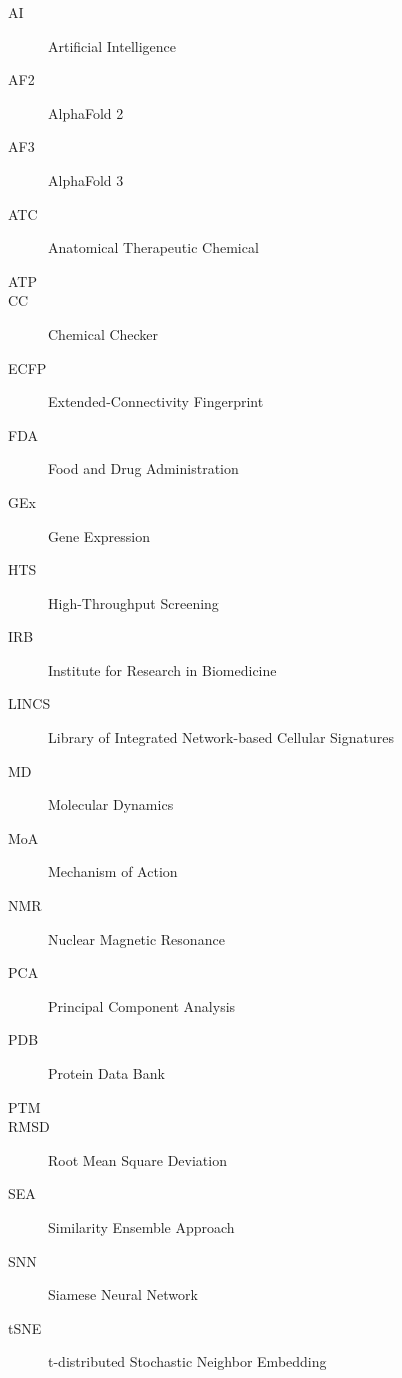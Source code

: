 

\begin{description}
    \item[AI] Artificial Intelligence
    \item[AF2] AlphaFold 2
    \item[AF3] AlphaFold 3
    \item[ATC] Anatomical Therapeutic Chemical
    \item[ATP] 
    \item[CC] Chemical Checker
    \item[ECFP] Extended-Connectivity Fingerprint
    \item[FDA] Food and Drug Administration
    \item[GEx] Gene Expression
    \item[HTS] High-Throughput Screening
    \item[IRB] Institute for Research in Biomedicine 
    \item[LINCS] Library of Integrated Network-based Cellular Signatures
    \item[MD] Molecular Dynamics
    \item[MoA] Mechanism of Action
    \item[NMR] Nuclear Magnetic Resonance
    \item[PCA] Principal Component Analysis
    \item[PDB] Protein Data Bank
    \item[PTM] 
    \item[RMSD] Root Mean Square Deviation
    \item[SEA] Similarity Ensemble Approach
    \item[SNN] Siamese Neural Network
    \item[tSNE] t-distributed Stochastic Neighbor Embedding
\end{description}

